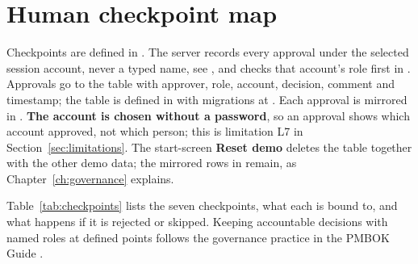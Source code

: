 \chapter{Human checkpoint map}
\label{ch:checkpoints}

Checkpoints are defined in . The server records every approval under the selected session account, never a typed name, see , and checks that account's role first in . Approvals go to the  table with approver, role, account, decision, comment and timestamp; the table is defined in  with migrations at . Each approval is mirrored in . \textbf{The account is chosen without a password}, so an approval shows which account approved, not which person; this is limitation L7 in Section~\ref{sec:limitations}. The start-screen \textbf{Reset demo} deletes the  table together with the other demo data; the mirrored rows in  remain, as Chapter~\ref{ch:governance} explains.

Table~\ref{tab:checkpoints} lists the seven checkpoints, what each is bound to, and what happens if it is rejected or skipped. Keeping accountable decisions with named roles at defined points follows the governance practice in the PMBOK Guide \parencite{pmi2021pmbok7}.

